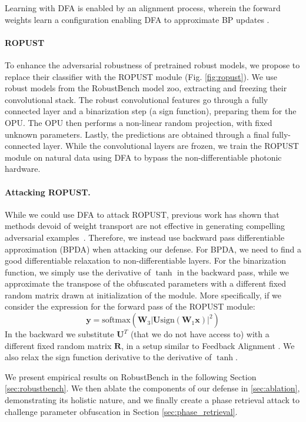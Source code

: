 Learning with DFA is enabled by an alignment process, wherein the forward weights learn a configuration enabling DFA to approximate BP updates \cite{refinetti2020dynamics}.

\paragraph{ROPUST} 
To enhance the adversarial robustness of pretrained robust models, we propose to replace their classifier with the ROPUST module (Fig. \ref{fig:ropust}). We use robust models from the RobustBench model zoo, extracting and freezing their convolutional stack. The robust convolutional features go through a fully connected layer and a binarization step (a sign function), preparing them for the OPU. The OPU then performs a non-linear random projection,  with fixed unknown parameters. Lastly, the predictions are obtained through a final fully-connected layer. While the convolutional layers are frozen, we train the ROPUST module on natural data using DFA to bypass the non-differentiable photonic hardware. 

\paragraph{Attacking ROPUST.} While we could use DFA to attack ROPUST, previous work has shown that methods devoid of weight transport are not effective in generating compelling adversarial examples~\cite{Akrout2019OnTA}. Therefore, we instead use backward pass differentiable approximation (BPDA) when attacking our defense. For BPDA, we need to find a good differentiable relaxation to non-differentiable layers. For the binarization function, we simply use the derivative of $\tanh$ in the backward pass, while we approximate the transpose of the obfuscated parameters with a different fixed random matrix drawn at initialization of the module. More specifically, if we consider the expression for the forward pass of the ROPUST module:
\begin{equation}
    \mathbf{y} = \mbox{softmax}(\mathbf{W}_3\lvert\mathbf{U} \mbox{sign}(\mathbf{W}_1 \mathbf{x})\rvert^2)
\end{equation}
In the backward we substitute $\mathbf{U}^T$ (that we do not have access to) with a different fixed random matrix $\mathbf{R}$, in a setup similar to Feedback Alignment \cite{Lillicrap2014RandomFW}. We also relax the sign function derivative to the derivative of $\tanh$.

We present empirical results on RobustBench in the following Section \ref{sec:robustbench}. We then ablate the components of our defense in \ref{sec:ablation}, demonstrating its holistic nature, and we finally create a phase retrieval attack to challenge parameter obfuscation in Section \ref{sec:phase_retrieval}.

